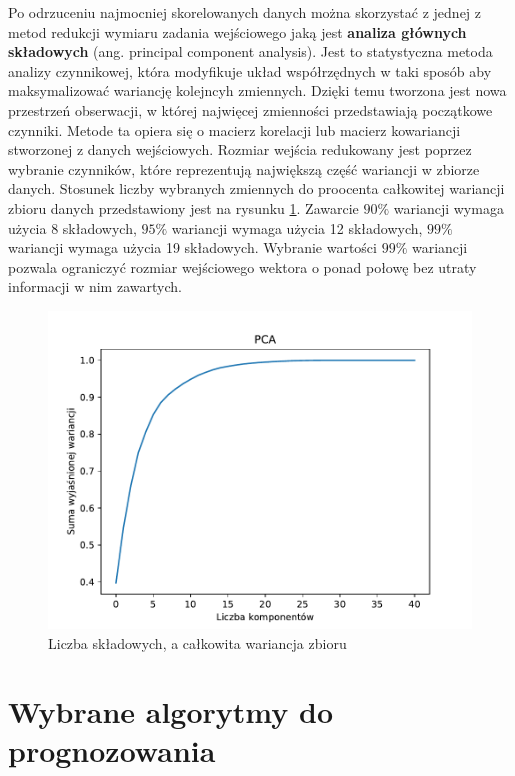 \documentclass[a4paper, twoside, 11pt, openright]{article}
\begin{document}
Po odrzuceniu najmocniej skorelowanych danych można skorzystać z jednej z metod redukcji wymiaru zadania wejściowego jaką jest \textbf{analiza głównych składowych} (ang. principal component analysis). Jest to statystyczna metoda analizy czynnikowej, która modyfikuje układ współrzędnych w taki sposób aby maksymalizować wariancję kolejncyh zmiennych. Dzięki temu tworzona jest nowa przestrzeń obserwacji, w której najwięcej zmienności przedstawiają początkowe czynniki. Metode ta opiera się o macierz korelacji lub macierz kowariancji stworzonej z danych wejściowych. Rozmiar wejścia redukowany jest poprzez wybranie czynników, które reprezentują największą część wariancji w zbiorze danych. Stosunek liczby wybranych zmiennych do proocenta całkowitej wariancji zbioru danych przedstawiony jest na rysunku \ref{pca_variance}. Zawarcie $90\%$ wariancji wymaga użycia 8 składowych,  $95\%$ wariancji wymaga użycia 12 składowych, $99\%$ wariancji wymaga użycia 19 składowych. Wybranie wartości $99\%$ wariancji pozwala ograniczyć rozmiar wejściowego wektora o ponad połowę bez utraty informacji w nim zawartych.

\begin{figure}[H]
\centering 
\includegraphics[scale=0.9]{img/pca_variance.pdf}
\caption{Liczba składowych, a całkowita wariancja zbioru}
\label{pca_variance}
\end{figure}

\newpage

\section{Wybrane algorytmy do prognozowania}
\end{document}

